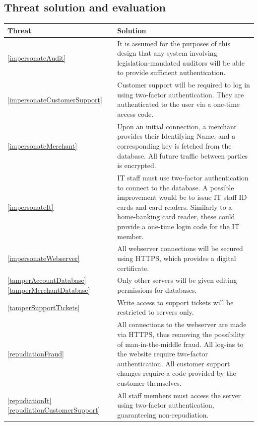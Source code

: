 \subsection{Threat solution and evaluation}

\begin{longtable}{|| p{} | p{} ||}
    \hline
    Threat & Solution \\
    \hline\hline

              \ref{impersonateAudit} & 
        It is assumed for the purposes of this design that any system involving legislation-mandated auditors will be able to provide sufficient authentication.
    \\ \hline \ref{impersonateCustomerSupport} & 
        Customer support will be required to log in using two-factor authentication. They are authenticated to the user via a one-time access code.
    \\ \hline \ref{impersonateMerchant} &
        Upon an initial connection, a merchant provides their Identifying Name, and a corresponding key is fetched from the database. All future traffic between parties is encrypted.
    \\ \hline \ref{impersonateIt} &
        IT staff must use two-factor authentication to connect to the database. A possible improvement would be to issue IT staff ID cards and card readers. Similarly to a home-banking card reader, these could provide a one-time login code for the IT member.
    \\ \hline \ref{impersonateWebserver} &
        All webserver connections will be secured using HTTPS, which provides a digital certificate.
    \\ \hline \ref{tamperAccountDatabase} \ref{tamperMerchantDatabase} &
        Only other servers will be given editing permissions for databases.
    \\ \hline \ref{tamperSupportTickets} &
        Write access to support tickets will be restricted to servers only. 
    \\ \hline \ref{repudiationFraud} &
        All connections to the webserver are made via HTTPS, thus removing the possibility of man-in-the-middle fraud. All log-ins to the website require two-factor authentication. All customer support changes require a code provided by the customer themselves.
    \\ \hline \ref{repudiationIt} \ref{repudiationCustomerSupport} &
        All staff members must access the server using two-factor authentication, guaranteeing non-repudiation. 

\end{longtable}
